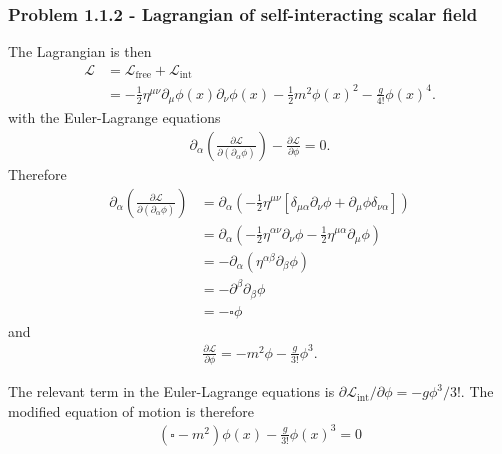 \documentclass[10pt,a4paper]{book}
\theoremstyle{definition}
\begin{document}
\subsubsection{Problem 1.1.2 - Lagrangian of self-interacting scalar field}
The Lagrangian is then
\begin{align}
    \mathcal{L}&=\mathcal{L}_\text{free}+\mathcal{L}_\text{int}\\
                &=-\frac{1}{2}\eta^{\mu\nu}\partial_\mu\phi(x)\partial_\nu\phi(x)-\frac{1}{2}m^2\phi(x)^2-\frac{g}{4!}\phi(x)^4.
\end{align}
with the Euler-Lagrange equations
\begin{align}
    \partial_\alpha\left(\frac{\partial\mathcal{L}}{\partial(\partial_\alpha\phi)}\right)-\frac{\partial\mathcal{L}}{\partial\phi}=0.
\end{align}
Therefore
\begin{align}
    \partial_\alpha\left(\frac{\partial\mathcal{L}}{\partial(\partial_\alpha\phi)}\right)
    &=\partial_\alpha\left(-\frac{1}{2}\eta^{\mu\nu}[\delta_{\mu\alpha}\partial_\nu\phi+\partial_\mu\phi\delta_{\nu\alpha}]\right)\\
    &=\partial_\alpha\left(-\frac{1}{2}\eta^{\alpha\nu}\partial_\nu\phi-\frac{1}{2}\eta^{\mu\alpha}\partial_\mu\phi\right)\\
    &=-\partial_\alpha\left(\eta^{\alpha\beta}\partial_\beta\phi\right)\\
    &=-\partial^\beta\partial_\beta\phi\\
    &=-\square\phi
\end{align}
and
\begin{align}
    \frac{\partial\mathcal{L}}{\partial\phi} = -m^2\phi-\frac{g}{3!}\phi^3.
\end{align}

The relevant term in the Euler-Lagrange equations is $\partial\mathcal{L}_\text{int}/\partial\phi=-g\phi^3/3!$. The modified equation of motion is therefore
\begin{align}
    (\square - m^2)\phi(x)-\frac{g}{3!}\phi(x)^3=0
\end{align}
\end{document}
